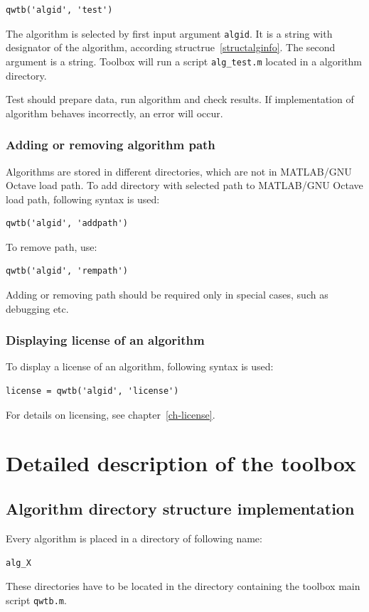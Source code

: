 \documentclass[12pt,a4paper,oneside]{report} %
\def\matlab{{\sc MATLAB}\xspace}
\def\octave{{\sc GNU Octave}\xspace}
\def\mgo{\matlab/\octave\xspace}
\begin{document}
\begin{lstlisting}
qwtb('algid', 'test')
\end{lstlisting}

The algorithm is selected by first input argument \lstinline{algid}. It is a string with
designator of the algorithm, according structrue~\ref{structalginfo}. The second argument is a
string. Toolbox will run a script \lstinline{alg_test.m} located in a algorithm directory.

Test should prepare data, run algorithm and check results. If implementation of algorithm
behaves incorrectly, an error will occur.

\subsection{Adding or removing algorithm path} %
Algorithms are stored in different directories, which are not in \mgo load path. To add directory
with selected path to \mgo load path, following syntax is used:

\begin{lstlisting}
qwtb('algid', 'addpath')
\end{lstlisting}

To remove path, use:

\begin{lstlisting}
qwtb('algid', 'rempath')
\end{lstlisting}

Adding or removing path should be required only in special cases, such as debugging etc.

\subsection{Displaying license of an algorithm} %
To display a license of an algorithm, following syntax is used:
\begin{lstlisting}
license = qwtb('algid', 'license')
\end{lstlisting}
For details on licensing, see chapter~\ref{ch-license}.


\chapter{Detailed description of the toolbox} %
\section{Algorithm directory structure implementation} %
\label{diralg}
Every algorithm is placed in a directory of following name:
\begin{center}
        {\tt alg\_X}
\end{center}
These directories have to be located in the directory containing the toolbox main script {\tt qwtb.m}.
\end{document}

